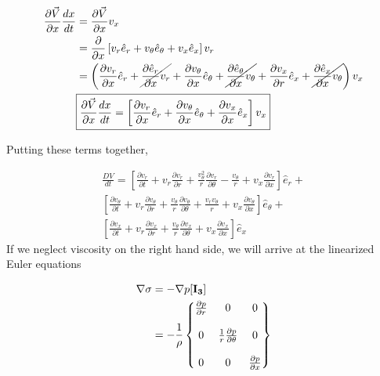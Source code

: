\documentclass[12pt]{article}
\begin{document}
\begin{align*}
\frac{\partial \vec{V}}{ \partial x}\frac{dx}{dt}  &= \frac{\partial \vec{V}}{ \partial x}v_x\\
&= \frac{\partial}{\partial x}
\left[
v_r 	   \hat{e}_r +
v_{\theta} \hat{e}_{\theta} +
v_x		   \hat{e}_x
\right]  v_r \\ 
&=
\left(
\frac{\partial v_r}{\partial x} 		\hat{e}_r +
\cancel{\frac{\partial  \hat{e}_r}{\partial x} 		v_r}       +
\frac{\partial v_{\theta}}{\partial x}		\hat{e}_{\theta} +
\cancel{\frac{\partial \hat{e}_{\theta}}{\partial x} v_{\theta}}  +
\frac{\partial v_x}{\partial r}\hat{e}_{x} +
\cancel{\frac{\partial \hat{e}_{x}}{\partial x} v_{\theta}} \right) v_x\\ 
&\boxed{ 
	\frac{\partial \vec{V}}{ \partial x}\frac{dx}{dt}     = \left[
	\frac{\partial 		  v_r}{\partial x} 		\hat{e}_r +
	\frac{\partial v_{\theta}}{\partial x}		\hat{e}_{\theta} +
	\frac{\partial v_x}{\partial x}\hat{e}_{x}\right] v_x} \\
\end{align*}


Putting these terms together,

\begin{align*}
\frac{DV}{dt} =
\left[ 
\frac{\partial v_r}{\partial t} + 
v_r \frac{\partial v_r}{\partial r}  +
\frac{v_{\theta}^2}{r}\frac{\partial v_r}{\partial \theta } -
\frac{v_{\theta}}{r} + v_x \frac{\partial v_r}{\partial x} 
\right] \hat{e}_r +\\
\left[ 
\frac{\partial v_\theta}{\partial t} + 
v_r \frac{\partial v_\theta}{\partial r}  +
\frac{v_{\theta}}{r}\frac{\partial v_{\theta}}{\partial \theta } +
\frac{v_r v_\theta}{r} +
v_x \frac{\partial v_{\theta}}{\partial x} 
\right] \hat{e}_{\theta} +\\
\left[ 
\frac{\partial v_x}{\partial t} + 
v_r \frac{\partial v_x}{\partial r}  +
\frac{v_{\theta}}{r}\frac{\partial v_x}{\partial \theta } + v_x \frac{\partial v_x}{\partial x} 
\right] \hat{e}_x
\end{align*}
If we neglect viscosity on the right hand side, we will arrive at the linearized Euler equations

\begin{align*}
\nabla \sigma &= -\nabla p [\bf{I_3}]\\
&=-\frac{1}{\rho}\begin{Bmatrix*}
\frac{\partial p}{\partial r} & 0 & 0\\
\\
0 & \frac{1}{r}\frac{\partial p}{\partial \theta} & 0\\
\\
0 & 0 &	\frac{\partial p}{\partial x} \\
\end{Bmatrix*}	
\end{align*}
\end{document}
